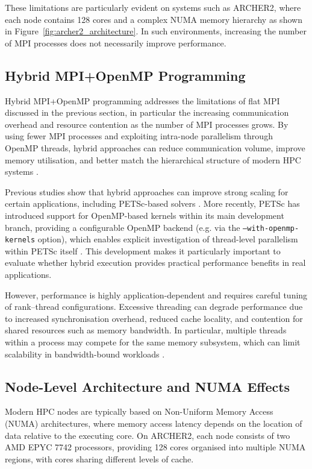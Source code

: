 \documentclass{article}
\begin{document}
These limitations are particularly evident on systems such as ARCHER2, where each node contains 128 cores and a complex NUMA memory hierarchy \cite{archer2_hardware}  as shown in Figure~\ref{fig:archer2_architecture}. 
In such environments, increasing the number of MPI processes does not necessarily improve performance.

\subsection{Hybrid MPI+OpenMP Programming}

Hybrid MPI+OpenMP programming addresses the limitations of flat MPI discussed in the previous section, 
in particular the increasing communication overhead and resource contention as the number of MPI processes grows.
By using fewer MPI processes and exploiting intra-node parallelism through OpenMP threads, 
hybrid approaches can reduce communication volume, improve memory utilisation, and better match the hierarchical structure of modern HPC systems \cite{judge2022mpiopenmp}.

Previous studies show that hybrid approaches can improve strong scaling for certain applications, including PETSc-based solvers \cite{lange_petsc_hybrid}. 
More recently, PETSc has introduced support for OpenMP-based kernels within its main development branch, 
providing a configurable OpenMP backend (e.g. via the \texttt{--with-openmp-kernels} option), 
which enables explicit investigation of thread-level parallelism within PETSc itself \cite{petsc_openmp_backend}. 
This development makes it particularly important to evaluate whether hybrid execution provides practical performance benefits in real applications.

However, performance is highly application-dependent and requires careful tuning of rank--thread configurations. 
Excessive threading can degrade performance due to increased synchronisation overhead, reduced cache locality, and contention for shared resources such as memory bandwidth. 
In particular, multiple threads within a process may compete for the same memory subsystem, which can limit scalability in bandwidth-bound workloads \cite{numa_tuning,topology_placement}.

\subsection{Node-Level Architecture and NUMA Effects}

Modern HPC nodes are typically based on Non-Uniform Memory Access (NUMA) architectures, where memory access latency depends on the location of data relative to the executing core. 
On ARCHER2, each node consists of two AMD EPYC 7742 processors, providing 128 cores organised into multiple NUMA regions, with cores sharing different levels of cache.
\end{document}
